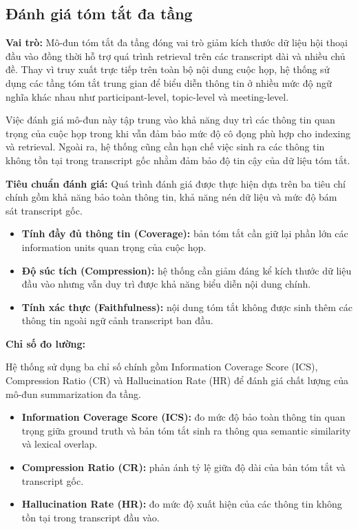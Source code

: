 \subsection{Đánh giá tóm tắt đa tầng}

\textbf{Vai trò:} Mô-đun tóm tắt đa tầng đóng vai trò giảm kích thước dữ liệu hội thoại đầu vào đồng thời hỗ trợ quá trình retrieval trên các transcript dài và nhiều chủ đề. Thay vì truy xuất trực tiếp trên toàn bộ nội dung cuộc họp, hệ thống sử dụng các tầng tóm tắt trung gian để biểu diễn thông tin ở nhiều mức độ ngữ nghĩa khác nhau như participant-level, topic-level và meeting-level.

Việc đánh giá mô-đun này tập trung vào khả năng duy trì các thông tin quan trọng của cuộc họp trong khi vẫn đảm bảo mức độ cô đọng phù hợp cho indexing và retrieval. Ngoài ra, hệ thống cũng cần hạn chế việc sinh ra các thông tin không tồn tại trong transcript gốc nhằm đảm bảo độ tin cậy của dữ liệu tóm tắt.

\textbf{Tiêu chuẩn đánh giá:} Quá trình đánh giá được thực hiện dựa trên ba tiêu chí chính gồm khả năng bảo toàn thông tin, khả năng nén dữ liệu và mức độ bám sát transcript gốc.

\begin{itemize}
    \item \textbf{Tính đầy đủ thông tin (Coverage):} bản tóm tắt cần giữ lại phần lớn các information units quan trọng của cuộc họp.
    
    \item \textbf{Độ súc tích (Compression):} hệ thống cần giảm đáng kể kích thước dữ liệu đầu vào nhưng vẫn duy trì được khả năng biểu diễn nội dung chính.
    
    \item \textbf{Tính xác thực (Faithfulness):} nội dung tóm tắt không được sinh thêm các thông tin ngoài ngữ cảnh transcript ban đầu.
\end{itemize}

\textbf{Chỉ số đo lường:}

Hệ thống sử dụng ba chỉ số chính gồm Information Coverage Score (ICS), Compression Ratio (CR) và Hallucination Rate (HR) để đánh giá chất lượng của mô-đun summarization đa tầng.

\begin{itemize}
    \item \textbf{Information Coverage Score (ICS):} đo mức độ bảo toàn thông tin quan trọng giữa ground truth và bản tóm tắt sinh ra thông qua semantic similarity và lexical overlap.
    
    \item \textbf{Compression Ratio (CR):} phản ánh tỷ lệ giữa độ dài của bản tóm tắt và transcript gốc.
    
    \item \textbf{Hallucination Rate (HR):} đo mức độ xuất hiện của các thông tin không tồn tại trong transcript đầu vào.
\end{itemize}


